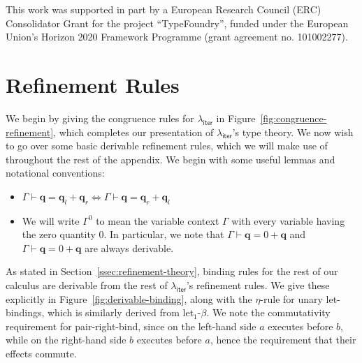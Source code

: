 \documentclass[acmsmall,screen,review]{acmart}
\newcommand{\mb}[1]{\ensuremath{\mathbf{#1}}}
\newcommand{\ms}[1]{\ensuremath{\mathsf{#1}}}
\newcommand{\qsp}[4]{#1 \vdash #2 = #3 + #4}
\newcommand{\brle}[1]{{\textsf{#1}}}
\newcommand{\subiterexp}{\texorpdfstring{\(\lambda_{\ms{iter}}\)}{lambda-iter}}
\newcommand{\zeroq}{0}
\begin{document}
This work was supported in part by a European Research Council (ERC) Consolidator Grant for the
project ``TypeFoundry'', funded under the European Union's Horizon 2020 Framework Programme (grant
agreement no. 101002277).




\clearpage 

\appendix

\section{Refinement Rules}

We begin by giving the congruence rules for \subiterexp{} in Figure~\ref{fig:congruence-refinement},
which completes our presentation of \subiterexp{}'s type theory. We now wish to go over some basic
derivable refinement rules, which we will make use of throughout the rest of the appendix. We begin
with some useful lemmas and notational conventions:
\begin{itemize}
  \item $\qsp{\Gamma}{\mb{q}}{\mb{q}_l}{\mb{q}_r} \iff \qsp{\Gamma}{\mb{q}}{\mb{q}_r}{\mb{q}_l}$
  \item We will write $\Gamma^\zeroq$ to mean the variable context $\Gamma$ with every variable
  having the zero quantity $\zeroq$. In particular, we note that $\qsp{\Gamma}{\mb{q}}{0}{\mb{q}}$
  and $\qsp{\Gamma}{\mb{q}}{0}{\mb{q}}$ are always derivable.
\end{itemize}
As stated in Section~\ref{ssec:refinement-theory}, binding rules for the rest of our calculus are
derivable from the rest of \subiterexp{}'s refinement rules. We give these explicitly in
Figure~\ref{fig:derivable-binding}, along with the $\eta$-rule for unary let-bindings, which is
similarly derived from \brle{let$_1$-$\beta$}. We note the commutativity requirement for
\brle{pair-right-bind}, since on the left-hand side $a$ executes before $b$, while on the right-hand
side $b$ executes before $a$, hence the requirement that their effects commute.
\end{document}
